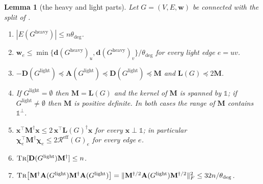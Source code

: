 \documentclass[11pt]{article}
\newtheorem{lemma}[theorem]{Lemma}
\theoremstyle{remark}
\renewcommand{\AA}{\mathbf A}
\newcommand{\cchi}{{\boldsymbol\chi}}
\newcommand{\dd}{\mathbf d}
\newcommand{\DD}{\mathbf D}
\newcommand{\LL}{\mathbf L}
\newcommand{\MM}{\mathbf M}
\newcommand{\ww}{\mathbf w}
\newcommand{\xx}{\mathbf x}
\newcommand{\dheavy}{\theta_{\deg}}
\newcommand{\Gh}{G^{\mathrm{heavy}}}
\newcommand{\Gl}{G^{\mathrm{light}}}
\newcommand{\Rcal}{\mathcal{R}}
\newcommand{\Reff}{\Rcal^{\mathrm{eff}}}
\newcommand{\norm}[1]{\lVert#1\rVert}
\newcommand{\oone}{\mathds{1}}
\newcommand{\tr}{\textsc{Tr}}
\begin{document}
\begin{lemma}[the heavy and light parts]
\label{lem:topk}
Let $G=(V,E,\ww)$ be connected with the split of .
\begin{enumerate}[label=(\alph*),leftmargin=*]
\item $|E(\Gh)|\le n\dheavy$.
\item $\ww_e\le\min\{\dd(\Gh)_u,\dd(\Gh)_v\}/\dheavy$ for every light edge
$e=uv$.
\item $-\DD(\Gl)\preceq\AA(\Gl)\preceq\DD(\Gl)\preceq\MM$ and
$\LL(G)\preceq2\MM$.
\item If $\Gl=\emptyset$ then $\MM=\LL(G)$ and the kernel of $\MM$ is spanned
by $\oone$; if $\Gl\neq\emptyset$ then $\MM$ is positive definite.
In both cases the range of $\MM$ contains $\oone^{\perp}$.
\item $\xx^{\top}\MM^{\dag}\xx\le2\,\xx^{\top}\LL(G)^{\dag}\xx$ for every
$\xx\perp\oone$; in particular
$\cchi_e^{\top}\MM^{\dag}\cchi_e\le2\Reff(G)_e$ for every edge $e$.
\item $\tr[\DD(\Gl)\MM^{\dag}]\le n$.
\item $\tr\bigl[\MM^{\dag}\AA(\Gl)\MM^{\dag}\AA(\Gl)\bigr]
=\norm{\MM^{\dag/2}\AA(\Gl)\MM^{\dag/2}}_F^{2}\le32n/\dheavy$.
\end{enumerate}
\end{lemma}
\end{document}

